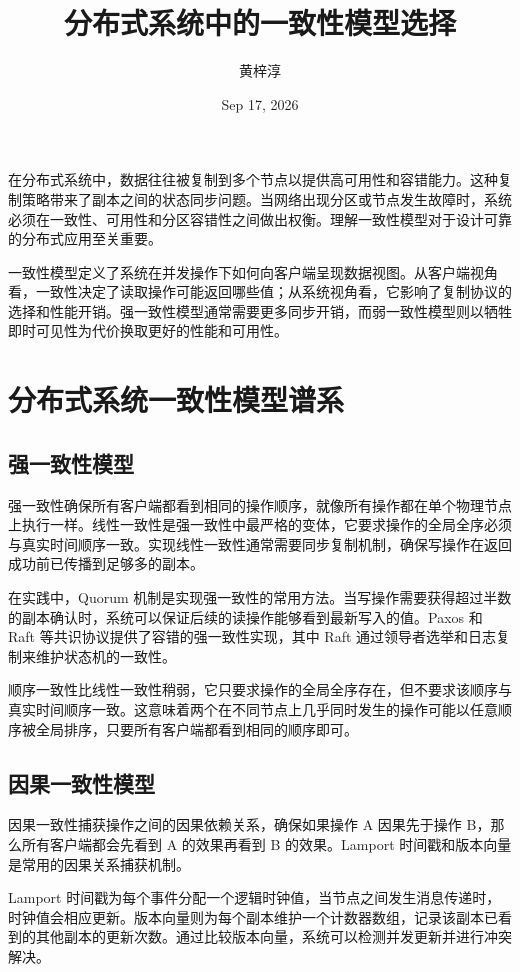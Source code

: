 \title{分布式系统中的一致性模型选择}
\author{黄梓淳}
\date{Sep 17, 2026}
\maketitle
在分布式系统中，数据往往被复制到多个节点以提供高可用性和容错能力。这种复制策略带来了副本之间的状态同步问题。当网络出现分区或节点发生故障时，系统必须在一致性、可用性和分区容错性之间做出权衡。理解一致性模型对于设计可靠的分布式应用至关重要。\par
一致性模型定义了系统在并发操作下如何向客户端呈现数据视图。从客户端视角看，一致性决定了读取操作可能返回哪些值；从系统视角看，它影响了复制协议的选择和性能开销。强一致性模型通常需要更多同步开销，而弱一致性模型则以牺牲即时可见性为代价换取更好的性能和可用性。\par
\chapter{分布式系统一致性模型谱系}
\section{强一致性模型}
强一致性确保所有客户端都看到相同的操作顺序，就像所有操作都在单个物理节点上执行一样。线性一致性是强一致性中最严格的变体，它要求操作的全局全序必须与真实时间顺序一致。实现线性一致性通常需要同步复制机制，确保写操作在返回成功前已传播到足够多的副本。\par
在实践中，Quorum 机制是实现强一致性的常用方法。当写操作需要获得超过半数的副本确认时，系统可以保证后续的读操作能够看到最新写入的值。Paxos 和 Raft 等共识协议提供了容错的强一致性实现，其中 Raft 通过领导者选举和日志复制来维护状态机的一致性。\par
顺序一致性比线性一致性稍弱，它只要求操作的全局全序存在，但不要求该顺序与真实时间顺序一致。这意味着两个在不同节点上几乎同时发生的操作可能以任意顺序被全局排序，只要所有客户端都看到相同的顺序即可。\par
\section{因果一致性模型}
因果一致性捕获操作之间的因果依赖关系，确保如果操作 A 因果先于操作 B，那么所有客户端都会先看到 A 的效果再看到 B 的效果。Lamport 时间戳和版本向量是常用的因果关系捕获机制。\par
Lamport 时间戳为每个事件分配一个逻辑时钟值，当节点之间发生消息传递时，时钟值会相应更新。版本向量则为每个副本维护一个计数器数组，记录该副本已看到的其他副本的更新次数。通过比较版本向量，系统可以检测并发更新并进行冲突解决。\par
